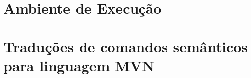 
\section{Ambiente de Execução}
  \label{chap:ambiente}
    

\section{Traduções de comandos semânticos para linguagem MVN}
  \label{chap:traducao}
    